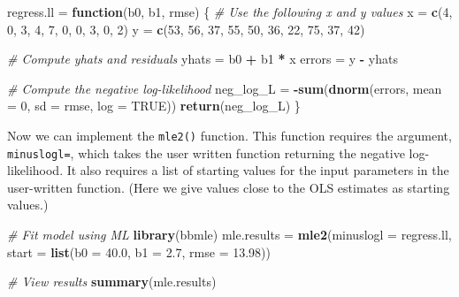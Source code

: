 \documentclass[]{book}
\newenvironment{Shaded}{\begin{snugshade}}{\end{snugshade}}
\newcommand{\CommentTok}[1]{\textcolor[rgb]{0.56,0.35,0.01}{\textit{#1}}}
\newcommand{\ControlFlowTok}[1]{\textcolor[rgb]{0.13,0.29,0.53}{\textbf{#1}}}
\newcommand{\DataTypeTok}[1]{\textcolor[rgb]{0.13,0.29,0.53}{#1}}
\newcommand{\DecValTok}[1]{\textcolor[rgb]{0.00,0.00,0.81}{#1}}
\newcommand{\FloatTok}[1]{\textcolor[rgb]{0.00,0.00,0.81}{#1}}
\newcommand{\KeywordTok}[1]{\textcolor[rgb]{0.13,0.29,0.53}{\textbf{#1}}}
\newcommand{\NormalTok}[1]{#1}
\newcommand{\OperatorTok}[1]{\textcolor[rgb]{0.81,0.36,0.00}{\textbf{#1}}}
\newcommand{\OtherTok}[1]{\textcolor[rgb]{0.56,0.35,0.01}{#1}}
\newcommand{\StringTok}[1]{\textcolor[rgb]{0.31,0.60,0.02}{#1}}
\begin{document}
\begin{Shaded}
\begin{Highlighting}[]
\NormalTok{regress.ll =}\StringTok{ }\ControlFlowTok{function}\NormalTok{(b0, b1, rmse) \{ }
  \CommentTok{# Use the following x and y values}
\NormalTok{  x =}\StringTok{ }\KeywordTok{c}\NormalTok{(}\DecValTok{4}\NormalTok{, }\DecValTok{0}\NormalTok{, }\DecValTok{3}\NormalTok{, }\DecValTok{4}\NormalTok{, }\DecValTok{7}\NormalTok{, }\DecValTok{0}\NormalTok{, }\DecValTok{0}\NormalTok{, }\DecValTok{3}\NormalTok{, }\DecValTok{0}\NormalTok{, }\DecValTok{2}\NormalTok{)}
\NormalTok{  y =}\StringTok{ }\KeywordTok{c}\NormalTok{(}\DecValTok{53}\NormalTok{, }\DecValTok{56}\NormalTok{, }\DecValTok{37}\NormalTok{, }\DecValTok{55}\NormalTok{, }\DecValTok{50}\NormalTok{, }\DecValTok{36}\NormalTok{, }\DecValTok{22}\NormalTok{, }\DecValTok{75}\NormalTok{, }\DecValTok{37}\NormalTok{, }\DecValTok{42}\NormalTok{)}
  
  \CommentTok{# Compute yhats and residuals}
\NormalTok{  yhats =}\StringTok{ }\NormalTok{b0 }\OperatorTok{+}\StringTok{ }\NormalTok{b1 }\OperatorTok{*}\StringTok{ }\NormalTok{x}
\NormalTok{  errors =}\StringTok{ }\NormalTok{y }\OperatorTok{-}\StringTok{ }\NormalTok{yhats}
  
  \CommentTok{# Compute the negative log-likelihood}
\NormalTok{  neg_log_L =}\StringTok{ }\OperatorTok{-}\KeywordTok{sum}\NormalTok{(}\KeywordTok{dnorm}\NormalTok{(errors, }\DataTypeTok{mean =} \DecValTok{0}\NormalTok{, }\DataTypeTok{sd =}\NormalTok{ rmse, }\DataTypeTok{log =} \OtherTok{TRUE}\NormalTok{))}
  \KeywordTok{return}\NormalTok{(neg_log_L)}
\NormalTok{\} }
\end{Highlighting}
\end{Shaded}

Now we can implement the \texttt{mle2()} function. This function requires the argument, \texttt{minuslogl=}, which takes the user written function returning the negative log-likelihood. It also requires a list of starting values for the input parameters in the user-written function. (Here we give values close to the OLS estimates as starting values.)

\begin{Shaded}
\begin{Highlighting}[]
\CommentTok{# Fit model using ML}
\KeywordTok{library}\NormalTok{(bbmle)}
\NormalTok{mle.results =}\StringTok{ }\KeywordTok{mle2}\NormalTok{(}\DataTypeTok{minuslogl =}\NormalTok{ regress.ll, }\DataTypeTok{start =} \KeywordTok{list}\NormalTok{(}\DataTypeTok{b0 =} \FloatTok{40.0}\NormalTok{, }\DataTypeTok{b1 =} \FloatTok{2.7}\NormalTok{, }\DataTypeTok{rmse =} \FloatTok{13.98}\NormalTok{))}

\CommentTok{# View results}
\KeywordTok{summary}\NormalTok{(mle.results)}
\end{Highlighting}
\end{Shaded}
\end{document}
